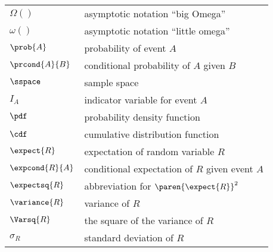\begin{center}
\begin{tabular}{ll}
$\Omega()$     & asymptotic notation ``big Omega''\\
$\omega()$     & asymptotic notation ``little omega''\\
$\prob{A}$     & probability of event $A$\\
$\prcond{A}{B}$ & conditional probability of $A$ given $B$\\
$\sspace$      & sample space\\
$I_A$          & indicator variable for event $A$\\
$\pdf$         & probability density function\\
$\cdf$         & cumulative distribution function\\
$\expect{R}$   & expectation of random variable $R$\\
$\expcond{R}{A}$ & conditional expectation of $R$ given event $A$\\
$\expectsq{R}$   & abbreviation for $\paren{\expect{R}}^2$\\
$\variance{R}$ & variance of $R$\\
$\Varsq{R}$     & the square of the variance of $R$\\
$\sigma_R$     & standard deviation of $R$
\end{tabular}
\end{center}

\endinput
